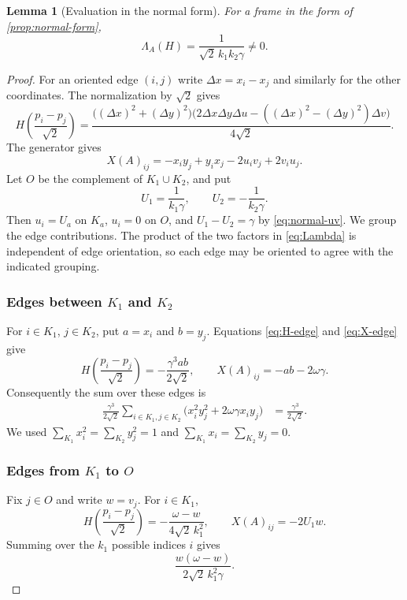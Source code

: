 \documentclass[11pt,reqno]{amsart}
\newtheorem{lemma}[lemma]{Lemma}
\theoremstyle{definition}
\theoremstyle{remark}
\numberwithin{equation}{section}
\begin{document}
\begin{lemma}[Evaluation in the normal form]\label{lem:normal-evaluation}
For a frame in the form of \cref{prop:normal-form},
\begin{equation}\label{eq:nonzero-obstruction}
 \Lambda_A(H)=\frac1{\sqrt2\,k_1k_2\gamma}\ne0.
\end{equation}
\end{lemma}
\begin{proof}
For an oriented edge $(i,j)$ write
$\Delta x=x_i-x_j$ and similarly for the other coordinates.
The normalization by $\sqrt2$ gives
\begin{equation}\label{eq:H-edge}
 H\!\left(\frac{p_i-p_j}{\sqrt2}\right)
 =\frac{\bigl((\Delta x)^2+(\Delta y)^2\bigr)
     \bigl(2\Delta x\Delta y\Delta u
        -((\Delta x)^2-(\Delta y)^2)\Delta v\bigr)}{4\sqrt2}.
\end{equation}
The generator gives
\begin{equation}\label{eq:X-edge}
 X(A)_{ij}=-x_i y_j+y_i x_j-2u_i v_j+2v_i u_j.
\end{equation}
Let $O$ be the complement of $K_1\cup K_2$, and put
\[
 U_1=\frac1{k_1\gamma},\qquad
 U_2=-\frac1{k_2\gamma}.
\]
Then $u_i=U_a$ on $K_a$, $u_i=0$ on $O$, and
$U_1-U_2=\gamma$ by \eqref{eq:normal-uv}.
We group the edge contributions. The product of the two factors
in \eqref{eq:Lambda} is independent of edge orientation, so each
edge may be oriented to agree with the indicated grouping.

\subsubsection*{Edges between $K_1$ and $K_2$}
For $i\in K_1$, $j\in K_2$, put $a=x_i$ and $b=y_j$.
Equations \eqref{eq:H-edge} and \eqref{eq:X-edge} give
\[
 H\!\left(\frac{p_i-p_j}{\sqrt2}\right)
    =-\frac{\gamma^3ab}{2\sqrt2},\qquad
 X(A)_{ij}=-ab-2\omega\gamma.
\]
Consequently the sum over these edges is
\begin{align}
 \frac{\gamma^3}{2\sqrt2}
 \sum_{i\in K_1,j\in K_2}
       \bigl(x_i^2y_j^2+2\omega\gamma x_i y_j\bigr)
 &=\frac{\gamma^3}{2\sqrt2}.
 \label{eq:cross-sum}
\end{align}
We used $\sum_{K_1}x_i^2=\sum_{K_2}y_j^2=1$ and
$\sum_{K_1}x_i=\sum_{K_2}y_j=0$.

\subsubsection*{Edges from $K_1$ to $O$}
Fix $j\in O$ and write $w=v_j$. For $i\in K_1$,
\[
 H\!\left(\frac{p_i-p_j}{\sqrt2}\right)
       =-\frac{\omega-w}{4\sqrt2\,k_1^2},\qquad
 X(A)_{ij}=-2U_1w.
\]
Summing over the $k_1$ possible indices $i$ gives
\begin{equation}\label{eq:K1O}
 \frac{w(\omega-w)}{2\sqrt2\,k_1^2\gamma}.
\end{equation}


\end{proof}
\end{document}
